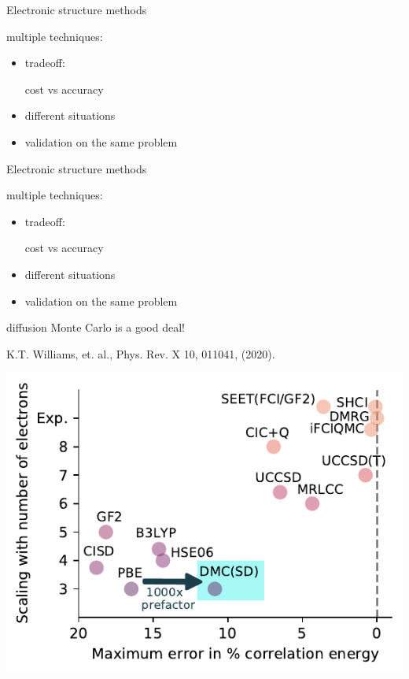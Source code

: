

\begin{frame}{Electronic structure methods}
\vspace{2em}
\begin{minipage}{.26\textwidth}
multiple techniques:
\begin{itemize}[leftmargin=1em, itemsep=1ex, label=-]
\item tradeoff: 

cost vs accuracy
\item different situations 
\item validation on the same problem
\end{itemize}
\end{minipage}
\end{frame}

\begin{frame}{Electronic structure methods}
\begin{minipage}{.26\textwidth}
multiple techniques:
\begin{itemize}[leftmargin=1em, itemsep=1ex, label=-]
\item tradeoff: 

cost vs accuracy
\item different situations 
\item validation on the same problem
\end{itemize}

\vspace{1em}
diffusion Monte Carlo is a good deal!

\vspace{1em}
\parbox{\textwidth}{\tiny K.T. Williams, et. al., Phys. Rev. X 10, 011041, (2020).}
\end{minipage}
\hspace{.03\textwidth}
\begin{minipage}{.65\textwidth}
\includegraphics[width=\textwidth]{figures/scaling_vs_energy.pdf}
\end{minipage}
\end{frame}


